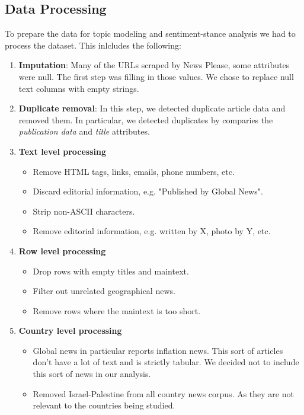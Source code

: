 \documentclass{article}
\theoremstyle{mytheoremstyle}
\theoremstyle{mytheoremstyle}
\theoremstyle{myproblemstyle}
\begin{document}
    \subsection{Data Processing}

    To prepare the data for topic modeling and sentiment-stance analysis we had to process the dataset. This inlcludes the following:

    \begin{enumerate}
        \item \textbf{Imputation}: Many of the URLs scraped by News Please, some attributes were null. The first step was filling in those values. We chose to replace null text columns with empty strings.
        \item \textbf{Duplicate removal}: In this step, we detected duplicate article data and removed them. In particular, we detected duplicates by comparies the \emph{publication data} and \emph{title} attributes.
        \item \textbf{Text level processing} \begin{itemize}
            \item Remove HTML tags, links, emails, phone numbers, etc.
            \item Discard editorial information, e.g. "Published by Global News".
            \item Strip non-ASCII characters.
            \item Remove editorial information, e.g. written by X, photo by Y, etc.
        \end{itemize}
        \item \textbf{Row level processing} \begin{itemize}
            \item Drop rows with empty titles and maintext.
            \item Filter out unrelated geographical news.
            \item Remove rows where the maintext is too short.
        \end{itemize}
        \item \textbf{Country level processing} \begin{itemize}
            \item Global news in particular reports inflation news. This sort of articles don't have a lot of text and is strictly tabular. We decided not to include this sort of news in our analysis.
            \item Removed Israel-Palestine from all country news corpus. As they are not relevant to the countries being studied.
        \end{itemize}
    \end{enumerate}
\end{document}
